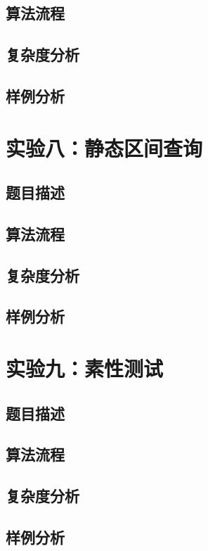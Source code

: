 \documentclass[UTF8,a4paperdui, %
]{ctexart}
\begin{document}
\subsection{算法流程}

\subsection{复杂度分析}

\subsection{样例分析}

\newpage
\section{实验八：静态区间查询}

\subsection{题目描述}

\subsection{算法流程}

\subsection{复杂度分析}

\subsection{样例分析}

\newpage
\section{实验九：素性测试}

\subsection{题目描述}

\subsection{算法流程}

\subsection{复杂度分析}

\subsection{样例分析}
\end{document}
